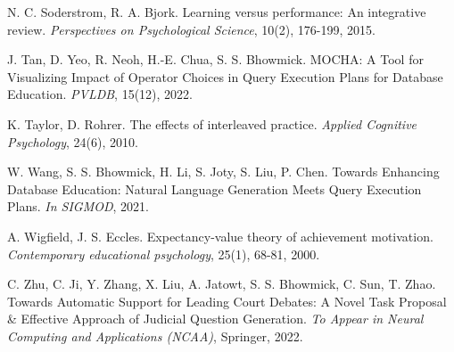 \documentclass[11pt]{article}
\begin{document}
\begin{thebibliography}{10}
\begin{small}
 N. C. Soderstrom, R. A. Bjork.  Learning versus performance: An integrative review. \textit{Perspectives on Psychological Science}, 10(2), 176-199, 2015.

 J. Tan,  D. Yeo, R. Neoh, H.-E. Chua, S. S. Bhowmick. MOCHA: A Tool for Visualizing Impact of Operator Choices in Query Execution Plans for Database Education.  \textit{PVLDB}, 15(12), 2022.

 K. Taylor, D. Rohrer. The effects of interleaved practice. \textit{Applied Cognitive Psychology}, 24(6), 2010.

 W. Wang, S. S. Bhowmick, H. Li, S. Joty, S. Liu, P. Chen. Towards Enhancing Database Education: Natural Language Generation Meets Query Execution Plans.\textit{ In SIGMOD}, 2021.


 A. Wigfield, J. S. Eccles. Expectancy-value theory of achievement motivation. \textit{Contemporary educational psychology}, 25(1), 68-81, 2000.

 C. Zhu, C. Ji, Y. Zhang, X. Liu, A. Jatowt, S. S. Bhowmick, C. Sun, T. Zhao. Towards Automatic Support for Leading Court Debates: A Novel Task Proposal \& Effective Approach of Judicial Question Generation.  {\em To Appear in Neural Computing and Applications (NCAA)\/}, Springer, 2022.
	
	\end{small}
\end{thebibliography}
\end{document}
